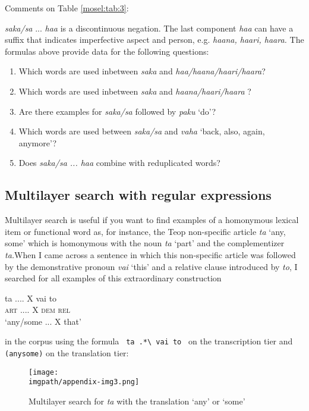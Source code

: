 Comments on Table \ref{mosel:tab:3}:

\textit{saka/sa} ... \textit{haa} is a discontinuous negation. The last component \textit{haa} can have a suffix that indicates imperfective aspect and person, e.g. \textit{haana, haari, haara.} The formulas above provide data for the following questions:

\begin{enumerate}
\item Which words are used inbetween \textit{saka} and \textit{haa/haana/haari/haara}?
\item Which words are used inbetween \textit{saka} and \textit{haana/haari/haara} ?
\item Are there examples for \textit{saka/sa} followed by \textit{paku} `do'?
\item Which words are used between \textit{saka/sa} and \textit{vaha} `back, also, again, anymore'?
\item Does \textit{saka/sa ... haa} combine with reduplicated words?
\end{enumerate}

\subsection{Multilayer search with regular expressions}

Multilayer search is useful if you want to find examples of a homonymous lexical item or functional word as, for instance, the Teop non-specific article \textit{ta} `any, some' which is homonymous with the noun \textit{ta} `part' and the complementizer \textit{ta.}When I came across a sentence in which this non-specific article was followed by the demonstrative pronoun \textit{vai} `this' and a relative clause introduced by \textit{to}, I searched for all examples of this extraordinary construction 

\ea
\gll ta ....  X vai to \\
     \textsc{art} .... X \textsc{dem} \textsc{rel} \\
      `any/some ... X that'
\z

in the corpus using the formula
\texttt{
 {\regexB}ta{\regexB} .*{\textbackslash} {\regexB}vai{\regexB} {\regexB}to{\regexB}
}
 on the transcription tier and \texttt{(any{\textbar}some)} on the translation tier:


\begin{figure}[h]
\texttt{[image: \\imgpath/appendix-img3.png]}
 
\caption{Multilayer search for \textit{ta} with the translation `any' or `some'}
\end{figure}


